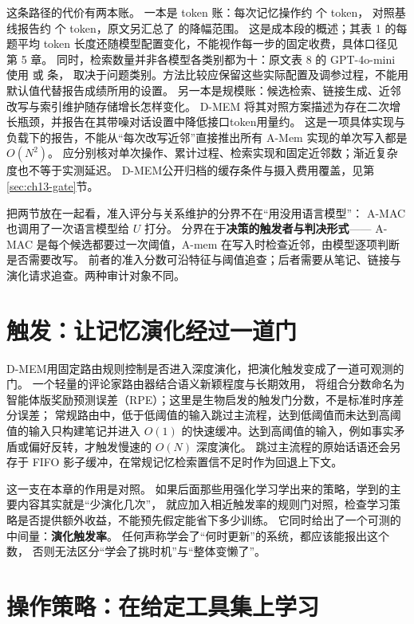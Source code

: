 这条路径的代价有两本账。
一本是 token 账：每次记忆操作约  个 token，
对照基线报告约  个 token，原文另汇总了  的降幅范围\cite{amem-2502}。
这是成本段的概述；其表 1 的每题平均 token 长度还随模型配置变化，不能视作每一步的固定收费，具体口径见第 5 章。
同时，检索数量并非各模型各类别都为十：原文表 8 的 GPT-4o-mini 使用  或  条，
取决于问题类别。方法比较应保留这些实际配置及调参过程，不能用默认值代替报告成绩所用的设置。
另一本是规模账：候选检索、链接生成、近邻改写与索引维护随存储增长怎样变化。
D-MEM 将其对照方案描述为存在二次增长瓶颈，并报告在其带噪对话设置中降低接口token用量约\cite{dmem-2603}。
这是一项具体实现与负载下的报告，不能从“每次改写近邻”直接推出所有 A-Mem 实现的单次写入都是 $O(N^2)$。
应分别核对单次操作、累计过程、检索实现和固定近邻数；渐近复杂度也不等于实测延迟。 D-MEM公开归档的缓存条件与摄入费用覆盖，见第\ref{sec:ch13-gate}节。

把两节放在一起看，准入评分与关系维护的分界不在“用没用语言模型”：
A-MAC 也调用了一次语言模型给 $U$ 打分。
分界在于\textbf{决策的触发者与判决形式}——
A-MAC 是每个候选都要过一次阈值，A-mem 在写入时检查近邻，由模型逐项判断是否需要改写。
前者的准入分数可沿特征与阈值追查；后者需要从笔记、链接与演化请求追查。两种审计对象不同。

\section{触发：让记忆演化经过一道门}
\label{sec:ch06-gate}

D-MEM用固定路由规则控制是否进入深度演化，把演化触发变成了一道可观测的门。
一个轻量的评论家路由器结合语义新颖程度与长期效用，
将组合分数命名为智能体版奖励预测误差（RPE）；这里是生物启发的触发门分数，不是标准时序差分误差；
常规路由中，低于低阈值的输入跳过主流程，达到低阈值而未达到高阈值的输入只构建笔记并进入 $O(1)$ 的快速缓冲。达到高阈值的输入，例如事实矛盾或偏好反转，才触发慢速的 $O(N)$ 深度演化\cite{dmem-2603}。
跳过主流程的原始话语还会另存于 FIFO 影子缓冲，在常规记忆检索置信不足时作为回退上下文\cite{dmem-2603}。

这一支在本章的作用是对照。
如果后面那些用强化学习学出来的策略，学到的主要内容其实就是“少演化几次”，
就应加入相近触发率的规则门对照，检查学习策略是否提供额外收益，不能预先假定能省下多少训练。
它同时给出了一个可测的中间量：\textbf{演化触发率}。
任何声称学会了“何时更新”的系统，都应该能报出这个数，
否则无法区分“学会了挑时机”与“整体变懒了”。

\section{操作策略：在给定工具集上学习}
\label{sec:ch06-mdp}


